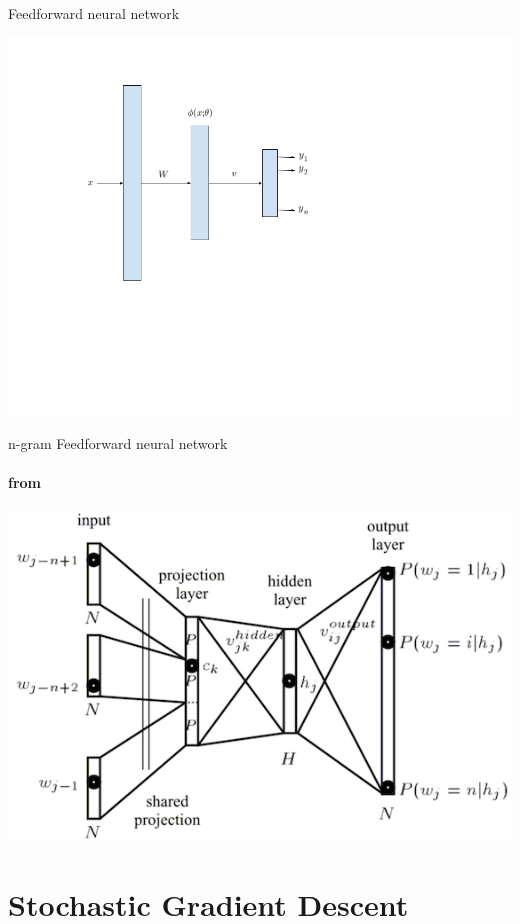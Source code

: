 \begin{frame}{Feedforward neural network}
\begin{block}{}
\centering
\includegraphics[scale=0.4]{figures/ff/ffnet.png}
\end{block}
\end{frame}

\begin{frame}{n-gram Feedforward neural network}
\framesubtitle{from \cite{Bengio2003}}
\begin{block}{}
\centering
\includegraphics[scale=0.4]{figures/ff/ngramfflm.png}
\end{block}
\end{frame}

\section{Stochastic Gradient Descent}
\frame{\tableofcontents[currentsection]}

